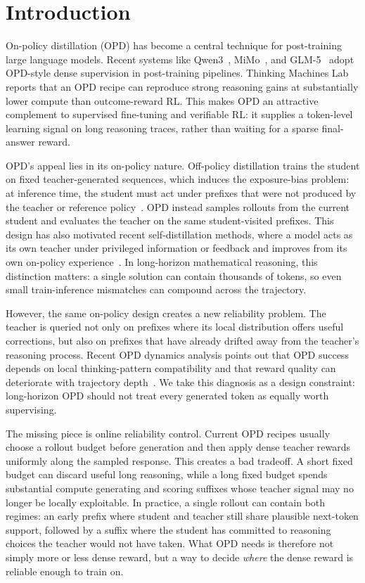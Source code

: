 \section{Introduction}
\vspace{-2mm}
On-policy distillation (OPD) has become a central technique for post-training large language models.
Recent systems like Qwen3~\citep{yang2025qwen3}, MiMo~\citep{xiao2026mimo}, and GLM-5~\citep{zeng2026glm} adopt OPD-style dense supervision in post-training pipelines. Thinking Machines Lab~\citep{lu2025onpolicydistillation} reports that an OPD recipe can reproduce strong reasoning gains at substantially lower compute than outcome-reward RL.
This makes OPD an attractive complement to supervised fine-tuning and verifiable RL: it supplies a token-level learning signal on long reasoning traces, rather than waiting for a sparse final-answer reward.

OPD's appeal lies in its on-policy nature. Off-policy distillation trains the student on fixed teacher-generated sequences, which induces the exposure-bias problem: at inference time, the student must act under prefixes that were not produced by the teacher or reference policy~\citep{bengio2015scheduled}.
OPD instead samples rollouts from the current student and evaluates the teacher on the same student-visited prefixes.
This design has also motivated recent self-distillation methods, where a model acts as its own teacher under privileged information or feedback and improves from its own on-policy experience~\citep{hubotter2026reinforcement,zhao2026self,shenfeld2026self}.
In long-horizon mathematical reasoning, this distinction matters: a single solution can contain thousands of tokens, so even small train-inference mismatches can compound across the trajectory.

However, the same on-policy design creates a new reliability problem.
The teacher is queried not only on prefixes where its local distribution offers useful corrections, but also on prefixes that have already drifted away from the teacher's reasoning process.
Recent OPD dynamics analysis points out that OPD success depends on local thinking-pattern compatibility and that reward quality can deteriorate with trajectory depth~\citep{li2026rethinking}.
We take this diagnosis as a design constraint: long-horizon OPD should not treat every generated token as equally worth supervising.

The missing piece is online reliability control.
Current OPD recipes usually choose a rollout budget before generation and then apply dense teacher rewards uniformly along the sampled response.
This creates a bad tradeoff.
A short fixed budget can discard useful long reasoning, while a long fixed budget spends substantial compute generating and scoring suffixes whose teacher signal may no longer be locally exploitable.
In practice, a single rollout can contain both regimes: an early prefix where student and teacher still share plausible next-token support, followed by a suffix where the student has committed to reasoning choices the teacher would not have taken.
What OPD needs is therefore not simply more or less dense reward, but a way to decide \emph{where} the dense reward is reliable enough to train on.

